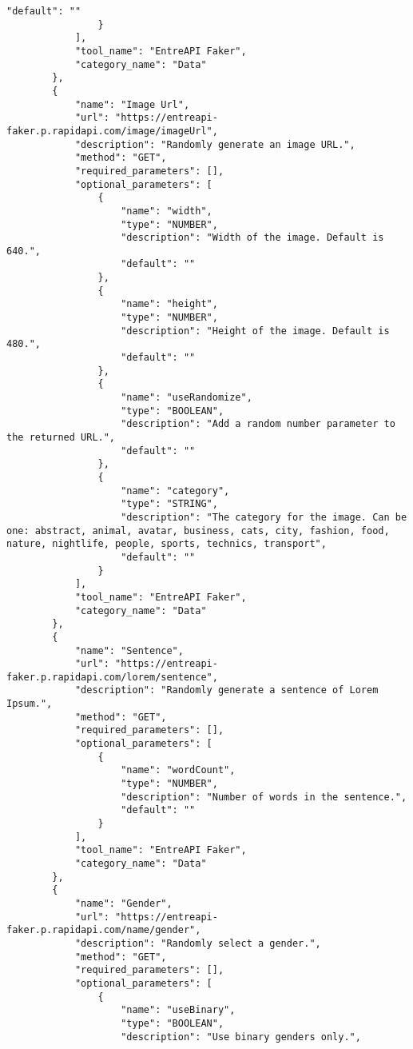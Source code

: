 \begin{lstlisting}[basicstyle=\ttfamily, breaklines=true]
                    "default": ""
                }
            ],
            "tool_name": "EntreAPI Faker",
            "category_name": "Data"
        },
        {
            "name": "Image Url",
            "url": "https://entreapi-faker.p.rapidapi.com/image/imageUrl",
            "description": "Randomly generate an image URL.",
            "method": "GET",
            "required_parameters": [],
            "optional_parameters": [
                {
                    "name": "width",
                    "type": "NUMBER",
                    "description": "Width of the image. Default is 640.",
                    "default": ""
                },
                {
                    "name": "height",
                    "type": "NUMBER",
                    "description": "Height of the image. Default is 480.",
                    "default": ""
                },
                {
                    "name": "useRandomize",
                    "type": "BOOLEAN",
                    "description": "Add a random number parameter to the returned URL.",
                    "default": ""
                },
                {
                    "name": "category",
                    "type": "STRING",
                    "description": "The category for the image. Can be one: abstract, animal, avatar, business, cats, city, fashion, food, nature, nightlife, people, sports, technics, transport",
                    "default": ""
                }
            ],
            "tool_name": "EntreAPI Faker",
            "category_name": "Data"
        },
        {
            "name": "Sentence",
            "url": "https://entreapi-faker.p.rapidapi.com/lorem/sentence",
            "description": "Randomly generate a sentence of Lorem Ipsum.",
            "method": "GET",
            "required_parameters": [],
            "optional_parameters": [
                {
                    "name": "wordCount",
                    "type": "NUMBER",
                    "description": "Number of words in the sentence.",
                    "default": ""
                }
            ],
            "tool_name": "EntreAPI Faker",
            "category_name": "Data"
        },
        {
            "name": "Gender",
            "url": "https://entreapi-faker.p.rapidapi.com/name/gender",
            "description": "Randomly select a gender.",
            "method": "GET",
            "required_parameters": [],
            "optional_parameters": [
                {
                    "name": "useBinary",
                    "type": "BOOLEAN",
                    "description": "Use binary genders only.",

\end{lstlisting}
